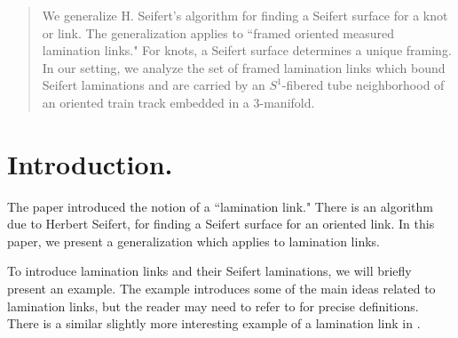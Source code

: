 \documentclass[12pt]{article}
\theoremstyle{remark}
\begin{document}
\def\abs{\odot}
\def\DS{\breve S}
\def\DL{\breve L}
\def\DBL{\breve{\bar L}}
\def\II{[0,\infty]}
\def\equiv{\hskip -3pt \sim}
\def\chim{\chi_-}

\def\split{\prec}
\def\pinch{\succ}
\def\OB{\mathbb O}
\def\FB{\mathbb F}
\def\SB{\mathbb S}

\def\TB{\mathbb T}
\def\OBB{{\mathbb S}\kern -6pt\raisebox{1.3pt}{--} \kern 2pt}
\def\Infty{\hbox{$\infty$\kern -8.1pt\raisebox{0.2pt}{--}\kern 1pt}}
\def\ens{\bar\circledwedge}
\def\ins{\circledwedge}
\def\rins{\circledvee}
\def\rens{\bar\circledvee}
\def\isom{\cong}
\def\bov{{\bf v}}
\def\boa{{\bf a}}
\def\boc{{\bf c}}
\def\bob{{\bf b}}
\def\bow{{\bf w}}
\def\bou{{\bf u}}
\def\boy{{\bf y}}
\def\bor{{\bf r}}
\def\bot{{\bf t}}
\def\boq{{\bf q}}
\def\boz{{\bf z}}
\def\boxx{{\bf x}}
\def\bop{{\bf p}}
\def\bos{{\bf s}}

\begin{abstract}  We generalize H. Seifert's algorithm for finding a Seifert surface for a knot or link.   The generalization applies to ``framed oriented measured lamination links."   For knots, a Seifert surface determines a unique framing. In our setting, we analyze the set of framed lamination links which bound Seifert laminations and are carried by an $S^1$-fibered tube neighborhood of an oriented train track embedded in a 3-manifold.   \end{abstract}


\section{Introduction.} 


The paper \cite{UO:LamLinks} introduced the notion of a ``lamination link."  There is an algorithm due to Herbert Seifert, \cite{HS:SeifertSurface} for finding a Seifert surface for an oriented link.   In this paper, we present a generalization which applies to lamination links.   

To introduce lamination links and their Seifert laminations, we will briefly present an example.  The example introduces some of the main ideas related to lamination links, but the reader may need to refer to \cite{UO:LamLinks} for precise definitions.   There is a similar slightly more interesting example of a lamination link in \cite{UO:LamLinks}.   
\end{document}

